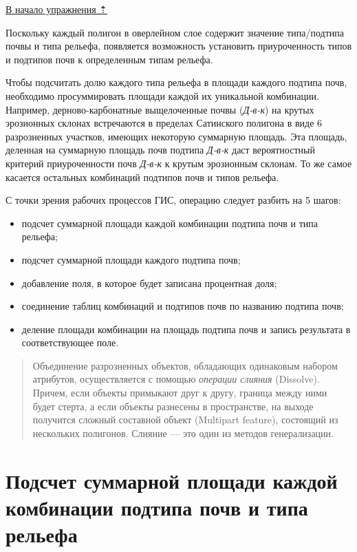 \documentclass[12pt,]{book}
\begin{document}
\protect\hyperlink{overlay}{В начало упражнения ⇡}

Поскольку каждый полигон в оверлейном слое содержит значение типа/подтипа почвы и типа рельефа, появляется возможность установить приуроченность типов и подтипов почв к определенным типам рельефа.

Чтобы подсчитать долю каждого типа рельефа в площади каждого подтипа почв, необходимо просуммировать площади каждой их уникальной комбинации. Например, дерново-карбонатные выщелоченные почвы (\emph{Д-в-к}) на крутых эрозионных склонах встречаются в пределах Сатинского полигона в виде 6 разрозненных участков, имеющих некоторую суммарную площадь. Эта площадь, деленная на суммарную площадь почв подтипа \emph{Д-в-к} даст вероятностный критерий приуроченности почв \emph{Д-в-к} к крутым эрозионным склонам. То же самое касается остальных комбинаций подтипов почв и типов рельефа.

С точки зрения рабочих процессов ГИС, операцию следует разбить на 5 шагов:

\begin{itemize}
\item
  подсчет суммарной площади каждой комбинации подтипа почв и типа рельефа;
\item
  подсчет суммарной площади каждого подтипа почв;
\item
  добавление поля, в которое будет записана процентная доля;
\item
  соединение таблиц комбинаций и подтипов почв по названию подтипа почв;
\item
  деление площади комбинации на площадь подтипа почв и запись результата в соответствующее поле.
\end{itemize}

\begin{quote}
Объединение разрозненных объектов, обладающих одинаковым набором атрибутов, осуществляется с помощью \emph{операции слияния} (Dissolve). Причем, если объекты примыкают друг к другу, граница между ними будет стерта, а если объекты разнесены в пространстве, на выходе получится сложный составной объект (Multipart feature), состоящий из нескольких полигонов. Слияние --- это один из методов генерализации.
\end{quote}

\hypertarget{overlay-sumarea-combination}{%
\section{Подсчет суммарной площади каждой комбинации подтипа почв и типа рельефа}\label{overlay-sumarea-combination}}
\end{document}
